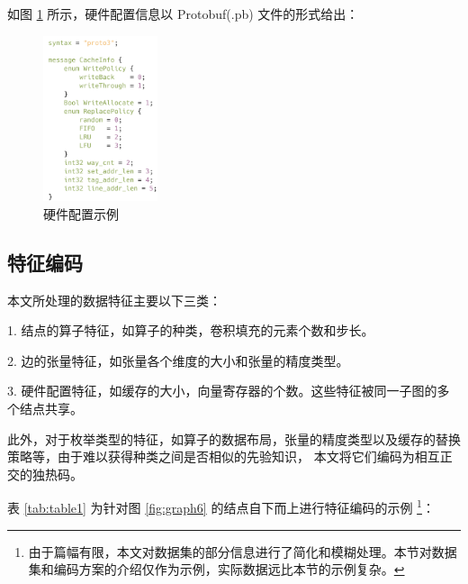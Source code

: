 如图 \ref{fig:graph7} 所示，硬件配置信息以 Protobuf(.pb)\cite{enwiki:1061454458} 文件的形式给出：

\begin{figure}[h]
    \centering
    \includegraphics[width=0.3\textwidth]{figures/pb.png}
    \caption{硬件配置示例}
    \label{fig:graph7}
\end{figure}

\subsection{特征编码}
本文所处理的数据特征主要以下三类：

1. 结点的算子特征，如算子的种类，卷积填充的元素个数和步长。

2. 边的张量特征，如张量各个维度的大小和张量的精度类型。

3. 硬件配置特征，如缓存的大小，向量寄存器的个数。这些特征被同一子图的多个结点共享。

此外，对于枚举类型的特征，如算子的数据布局，张量的精度类型以及缓存的替换策略等，由于难以获得种类之间是否相似的先验知识，
本文将它们编码为相互正交的独热码。

表 \ref{tab:table1} 为针对图 \ref{fig:graph6} 的结点自下而上进行特征编码的示例  \footnote{由于篇幅有限，本文对数据集的部分信息进行了简化和模糊处理。本节对数据集和编码方案的介绍仅作为示例，实际数据远比本节的示例复杂。}：

